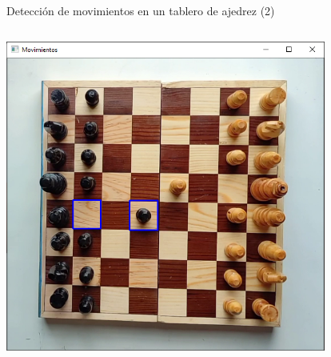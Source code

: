 \begin{frame}{Detección de movimientos en un tablero de ajedrez (2)}
\begin{columns}
\begin{column}{0.28\textwidth}
\begin{center}
     \includegraphics[width=0.79\textwidth]{Figs/AjedrezFroylan4}
     \end{center}
\end{column}

\end{columns}
\end{frame}

